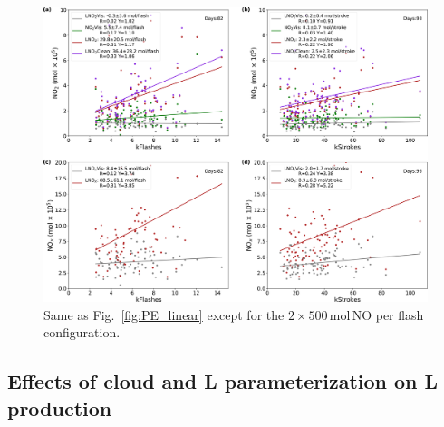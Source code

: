 \documentclass[amt]{copernicus}
\begin{document}
\begin{figure}[t]
    \includegraphics[width=15cm]{amt-2019-372-f09.png}
    \caption{Same as Fig.~\ref{fig:PE_linear} except for the $2\times500$\,mol\,NO per flash configuration.}
    \label{fig:PE_linear_2x500}
\end{figure}
\subsection{Effects of cloud and L parameterization on L production} \label{section:Effectsofcloud}
\end{document}
